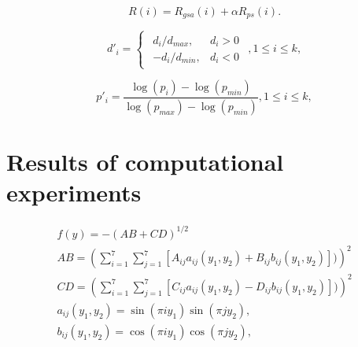 \documentclass[runningheads]{llncs}
\begin{document}
\begin{equation}
    \label{eq:16}
    R(i) = R_{gsa} (i) +  \alpha R_{ps} (i).
\end{equation}


\begin{equation}
    \label{eq:17}
d'_i=
\begin{cases}
  \begin{matrix}
     d_i / d_{max}, & d_i > 0 \\
     -d_i / d_{min}, & d_i < 0 
  \end{matrix}
\end{cases}, 
1 \leq i \leq k,
\end{equation}


\begin{equation}
    \label{eq:18}
p'_i= \frac{ \log (p_i) - \log (p_{min})}{ \log (p_{max}) - \log (p_{min})} , 1 \leq i \leq k,
\end{equation}


\section{Results of computational experiments}
\label{sec:5}


\begin{equation}
    \label{eq:19}
		\begin{matrix}
		  f(y)= -(AB + CD)^{1/2} \\
			AB =(\sum_{i=1}^7{\sum_{j=1}^7{[A_{ij} a_{ij} (y_1,y_2) + B_{ij} b_{ij} (y_1,y_2)])}})^2 \\
			CD =(\sum_{i=1}^7{\sum_{j=1}^7{[C_{ij} a_{ij} (y_1,y_2) - D_{ij} b_{ij} (y_1,y_2)])}})^2 \\
			a_{ij} (y_1,y_2) = \sin(\pi i y_1) \sin(\pi j y_2), \\
			b_{ij} (y_1,y_2) = \cos(\pi i y_1) \cos(\pi j y_2),
		\end{matrix}
\end{equation}



%
%
%
 
 
%
%
%
%
%
\end{document}
